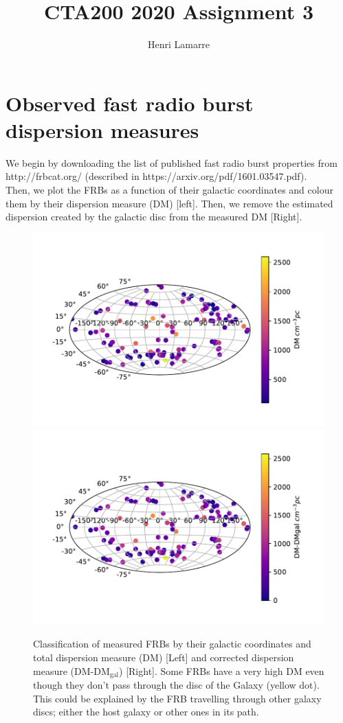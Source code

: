 \documentclass{article}
\title{CTA200 2020 Assignment 3}
\author{Henri Lamarre}
\date{}
\begin{document}
\maketitle

\section{Observed fast radio burst dispersion measures}
We begin by downloading the list of published fast radio 
burst properties from http://frbcat.org/ (described in 
https://arxiv.org/pdf/1601.03547.pdf). \\
Then, we plot the FRBs as a function of their galactic 
coordinates and colour them by their dispersion measure (DM) [left]. 
Then, we remove the estimated dispersion created by the galactic disc from the measured DM [Right].


\begin{figure}[h]
  \includegraphics[width = 0.5\columnwidth]{FRB_gal_coord.pdf}
  \includegraphics[width = 0.5\columnwidth]{FRB_gal_coord_corrected.pdf}
\caption{Classification of measured FRBs by their galactic coordinates and total dispersion measure (DM) [Left] and corrected dispersion measure 
(DM-D$\text{M}_\text{gal}$) [Right]. Some FRBs have a very high DM even though they don't pass through the disc of the Galaxy (yellow dot). 
This could be explained by the FRB travelling through other galaxy discs; either the host galaxy or other ones in its path.}
\label{frbcoords}
\end{figure}
\end{document}
